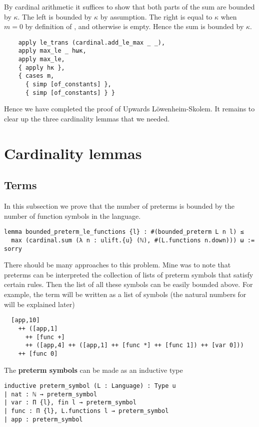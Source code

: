 By cardinal arithmetic it suffices to show that both parts of the
sum are bounded by $\kappa$.
The left is bounded by $\kappa$ {by assumption}.
The right is equal to $\kappa$ when $m = 0$ by definition of
, and otherwise is empty.
Hence the sum is bounded by $\kappa$.

\begin{lstlisting}
    apply le_trans (cardinal.add_le_max _ _),
    apply max_le _ hωκ,
    apply max_le,
    { apply hκ },
    { cases m,
      { simp [of_constants] },
      { simp [of_constants] } } \end{lstlisting}

Hence we have completed the proof of Upwards L\"{o}wenheim-Skolem.
It remains to clear up the three cardinality lemmas that we needed.


\section{Cardinality lemmas}

\subsection{Terms}

In this subsection we prove that the number of preterms is bounded by
the number of function symbols in the language.

\begin{lstlisting}
lemma bounded_preterm_le_functions {l} : #(bounded_preterm L n l) ≤
  max (cardinal.sum (λ n : ulift.{u} (ℕ), #(L.functions n.down))) ω := sorry \end{lstlisting}

There should be many approaches to this problem.
Mine was to note that preterms can be interpreted
the collection of lists of preterm symbols that satisfy certain rules.
Then the list of all these symbols can be easily bounded above.
For example, the term 
will be written as a list of symbols
(the natural numbers for  will be explained later)
\begin{lstlisting}
  [app,10]
    ++ ([app,1]
      ++ [func +]
      ++ ([app,4] ++ ([app,1] ++ [func *] ++ [func 1]) ++ [var 0]))
    ++ [func 0]
\end{lstlisting}

The \textbf{preterm symbols} can be made as an inductive type
\begin{lstlisting}
inductive preterm_symbol (L : Language) : Type u
| nat : ℕ → preterm_symbol
| var : Π {l}, fin l → preterm_symbol
| func : Π {l}, L.functions l → preterm_symbol
| app : preterm_symbol \end{lstlisting}

